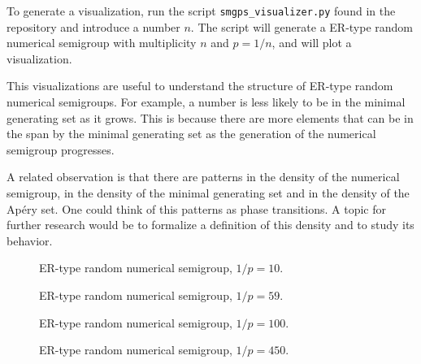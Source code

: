To generate a visualization, run the script \verb|smgps_visualizer.py| found in the repository \cite{morales2023} and introduce a number $n$. The script will generate a ER-type random numerical semigroup with multiplicity $n$ and $p = 1/n$, and will plot a visualization. \par

This visualizations are useful to understand the structure of ER-type random numerical semigroups. For example, a number is less likely to be in the minimal generating set as it grows. This is because there are more elements that can be in the span by the minimal generating set as the generation of the numerical semigroup progresses. \par

A related observation is that there are patterns in the density of the numerical semigroup, in the density of the minimal generating set and in the density of the Apéry set. One could think of this patterns as phase transitions. A topic for further research would be to formalize a definition of this density and to study its behavior. \par

\begin{figure}
    \begin{center}
        
    \end{center}
    \caption{ER-type random numerical semigroup, $1/p = 10$.}
\end{figure}

\begin{figure}
    \begin{center}
        
    \end{center}
    \caption{ER-type random numerical semigroup, $1/p = 59$.}
\end{figure}

\begin{figure}
    \begin{center}
        
    \end{center}
    \caption{ER-type random numerical semigroup, $1/p = 100$.}
\end{figure}

\begin{figure}
    \begin{center}
        
    \end{center}
    \caption{ER-type random numerical semigroup, $1/p = 450$.}
\end{figure}



